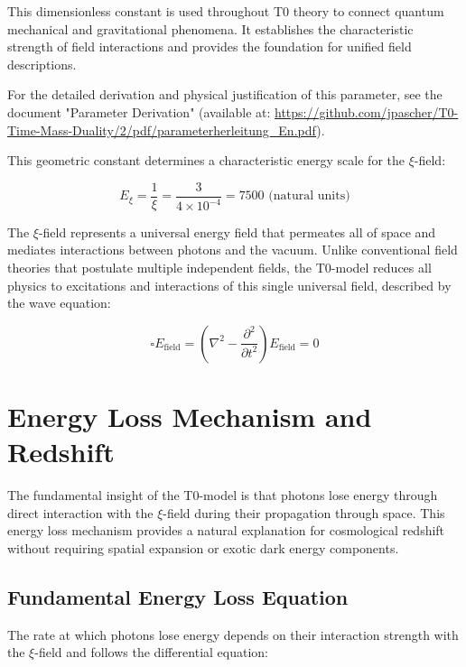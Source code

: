 \documentclass[12pt,a4paper]{article}
\begin{document}
This dimensionless constant is used throughout T0 theory to connect quantum mechanical and gravitational phenomena. It establishes the characteristic strength of field interactions and provides the foundation for unified field descriptions.

\begin{important}
	For the detailed derivation and physical justification of this parameter, see the document "Parameter Derivation" (available at: \url{https://github.com/jpascher/T0-Time-Mass-Duality/2/pdf/parameterherleitung_En.pdf}).
\end{important}

This geometric constant determines a characteristic energy scale for the $\xi$-field:

\begin{equation}
	E_\xi = \frac{1}{\xi} = \frac{3}{4 \times 10^{-4}} = 7500 \text{ (natural units)}
\end{equation}
	
	The $\xi$-field represents a universal energy field that permeates all of space and mediates interactions between photons and the vacuum. Unlike conventional field theories that postulate multiple independent fields, the T0-model reduces all physics to excitations and interactions of this single universal field, described by the wave equation:
	
	\begin{equation}
		\square E_{\text{field}} = \left(\nabla^2 - \frac{\partial^2}{\partial t^2}\right) E_{\text{field}} = 0
	\end{equation}
	
	\section{Energy Loss Mechanism and Redshift}
	
	The fundamental insight of the T0-model is that photons lose energy through direct interaction with the $\xi$-field during their propagation through space. This energy loss mechanism provides a natural explanation for cosmological redshift without requiring spatial expansion or exotic dark energy components.
	
	\subsection{Fundamental Energy Loss Equation}
	
	The rate at which photons lose energy depends on their interaction strength with the $\xi$-field and follows the differential equation:
	
\end{document}
